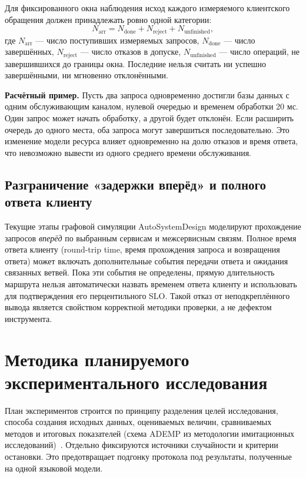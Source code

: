 Для фиксированного окна наблюдения исход каждого измеряемого клиентского обращения должен принадлежать ровно одной категории:
\begin{equation}
N_{\mathrm{arr}}=N_{\mathrm{done}}+
N_{\mathrm{reject}}+N_{\mathrm{unfinished}},
\label{eq:request-accounting}
\end{equation}
где $N_{\mathrm{arr}}$ --- число поступивших измеряемых запросов, $N_{\mathrm{done}}$ --- число завершённых, $N_{\mathrm{reject}}$ --- число отказов в допуске, $N_{\mathrm{unfinished}}$ --- число операций, не завершившихся до границы окна. Последние нельзя считать ни успешно завершёнными, ни мгновенно отклонёнными.

\textbf{Расчётный пример.} Пусть два запроса одновременно достигли базы данных с одним обслуживающим каналом, нулевой очередью и временем обработки 20 мс. Один запрос может начать обработку, а другой будет отклонён. Если расширить очередь до одного места, оба запроса могут завершиться последовательно. Это изменение модели ресурса влияет одновременно на долю отказов и время ответа, что невозможно вывести из одного среднего времени обслуживания.

\subsection{Разграничение «задержки вперёд» и полного ответа клиенту}

Текущие этапы графовой симуляции AutoSystemDesign моделируют прохождение запросов \emph{вперёд} по выбранным сервисам и межсервисным связям. Полное время ответа клиенту (round-trip time, время прохождения запроса и возвращения ответа) может включать дополнительные события передачи ответа и ожидания связанных ветвей. Пока эти события не определены, прямую длительность маршрута нельзя автоматически назвать временем ответа клиенту и использовать для подтверждения его перцентильного SLO. Такой отказ от неподкреплённого вывода является свойством корректной методики проверки, а не дефектом инструмента.

\section{Методика планируемого экспериментального исследования}

План экспериментов строится по принципу разделения целей исследования, способа создания исходных данных, оцениваемых величин, сравниваемых методов и итоговых показателей (схема ADEMP из методологии имитационных исследований)~\cite{morris2019simulation}. Отдельно фиксируются источники случайности и критерии остановки. Это предотвращает подгонку протокола под результаты, полученные на одной языковой модели.

